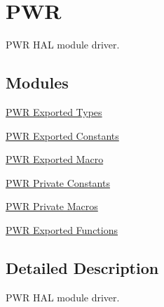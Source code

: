 \hypertarget{group___p_w_r}{}\section{P\+WR}
\label{group___p_w_r}


P\+WR H\+AL module driver.  


\subsection*{Modules}
\begin{DoxyCompactItemize}
\item 
\hyperlink{group___p_w_r___exported___types}{P\+W\+R Exported Types}
\item 
\hyperlink{group___p_w_r___exported___constants}{P\+W\+R Exported Constants}
\item 
\hyperlink{group___p_w_r___exported___macro}{P\+W\+R Exported Macro}
\item 
\hyperlink{group___p_w_r___private___constants}{P\+W\+R Private Constants}
\item 
\hyperlink{group___p_w_r___private___macros}{P\+W\+R Private Macros}
\item 
\hyperlink{group___p_w_r___exported___functions}{P\+W\+R Exported Functions}
\end{DoxyCompactItemize}


\subsection{Detailed Description}
P\+WR H\+AL module driver. 

